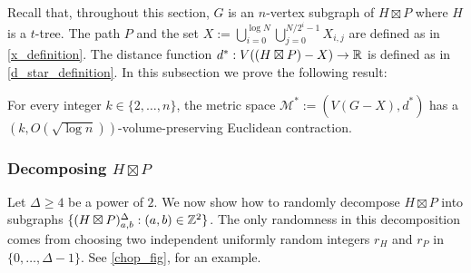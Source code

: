 \documentclass{patmorin}
\renewcommand{\ge}{\geqslant}
\newcommand{\david}[1]{{\color{orange} David: #1}}
\newcommand{\pat}[1]{\textcolor{Blue}{Pat: #1}}
\newcommand{\gwen}[1]{\textcolor{Purple}{Gwen: #1}}
\begin{document}
Recall that, throughout this section, $G$ is an $n$-vertex subgraph of $H\boxtimes P$ where $H$ is a $t$-tree. The path $P$ and the set $X:=\bigcup_{i=0}^{\log N}\bigcup_{j=0}^{N/2^i-1} X_{i,j}$ are defined as in \cref{x_definition}.  The distance function $d^*:V((H\boxtimes P)-X)\to\mathbb{R}$ is defined as in \cref{d_star_definition}.  In this subsection we prove the following result:


\begin{lem}\label{dstar_contraction}
For every integer $k\in\{2,\ldots,n\}$, the metric space $\mathcal{M}^*:=(V(G-X),d^*)$ has a $(k,O(\sqrt{\log n}))$-volume-preserving Euclidean contraction.
\end{lem}

\subsubsection{Decomposing $H\boxtimes P$}

Let $\Delta\ge 4$ be a power of $2$. We now show how to randomly decompose $H\boxtimes P$ into subgraphs $\{(H\boxtimes P)^\Delta_{a,b}:(a,b)\in\mathbb{Z}^2\}$. The only randomness in this decomposition comes from choosing two independent uniformly random integers $r_H$ and $r_P$ in $\{0,\ldots,\Delta-1\}$. See \cref{chop_fig}, for an example.
\end{document}
